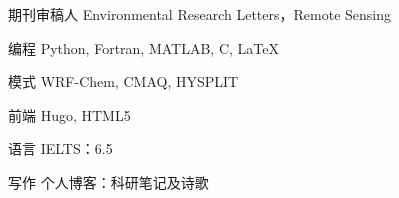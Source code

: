 
\begin{cvskills}

  \cvskill
    {期刊审稿人} %
    {Environmental Research Letters，Remote Sensing} %

  \cvskill
    {编程} %
    {Python, Fortran, MATLAB, C, \LaTeX} %

  \cvskill
    {模式} %
    {WRF-Chem, CMAQ, HYSPLIT} %

  \cvskill
    {前端} %
    {Hugo, HTML5} %

  \cvskill
    {语言} %
    {IELTS：6.5} %

  \cvskill
    {写作} %
    {个人博客：科研笔记及诗歌} %

\end{cvskills}
